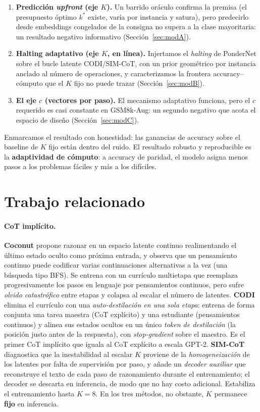 \documentclass[11pt]{article}
\begin{document}
\begin{enumerate}
  \item \textbf{Predicción \textit{upfront} (eje $K$).} Un barrido oráculo confirma la premisa (el presupuesto óptimo $k^*$ existe, varía por instancia y satura), pero predecirlo desde embeddings congelados de la consigna no supera a la clase mayoritaria: un resultado negativo informativo (Sección~\ref{sec:modA}).
  \item \textbf{Halting adaptativo (eje $K$, en línea).} Injertamos el \textit{halting} de PonderNet sobre el bucle latente CODI/SIM-CoT, con un prior geométrico por instancia anclado al número de operaciones, y caracterizamos la frontera accuracy--cómputo que el $K$ fijo no puede trazar (Sección~\ref{sec:modB}).
  \item \textbf{El eje $c$ (vectores por paso).} El mecanismo adaptativo funciona, pero el $c$ requerido es casi constante en GSM8k-Aug: un segundo negativo que acota el espacio de diseño (Sección~\ref{sec:modC}).
\end{enumerate}

Enmarcamos el resultado con honestidad: las ganancias de accuracy sobre el baseline de $K$ fijo están dentro del ruido. El resultado robusto y reproducible es la \textbf{adaptividad de cómputo}: a accuracy de paridad, el modelo asigna menos pasos a los problemas fáciles y más a los difíciles.

\section{Trabajo relacionado}

\paragraph{CoT implícito.} \textbf{Coconut} \citep{hao2024coconut} propone razonar en un espacio latente continuo realimentando el último estado oculto como próxima entrada, y observa que un pensamiento continuo puede codificar varias continuaciones alternativas a la vez (una búsqueda tipo BFS). Se entrena con un currículo multietapa que reemplaza progresivamente los pasos en lenguaje por pensamientos continuos, pero sufre \emph{olvido catastrófico} entre etapas y colapsa al escalar el número de latentes. \textbf{CODI} \citep{shen2025codi} elimina el currículo con una \emph{auto-destilación en una sola etapa}: entrena de forma conjunta una tarea maestra (CoT explícito) y una estudiante (pensamientos continuos) y alinea sus estados ocultos en un único \emph{token de destilación} (la posición justo antes de la respuesta), con \textit{stop-gradient} sobre el maestro. Es el primer CoT implícito que iguala al CoT explícito a escala GPT-2. \textbf{SIM-CoT} \citep{wei2025simcot} diagnostica que la inestabilidad al escalar $K$ proviene de la \emph{homogeneización} de los latentes por falta de supervisión por paso, y añade un \emph{decoder auxiliar} que reconstruye el texto de cada paso de razonamiento durante el entrenamiento; el decoder se descarta en inferencia, de modo que no hay costo adicional. Estabiliza el entrenamiento hasta $K=8$. En los tres métodos, no obstante, $K$ permanece \textbf{fijo} en inferencia.
\end{document}
